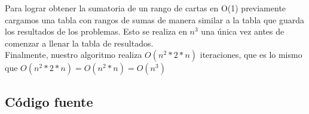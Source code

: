 Para lograr obtener la sumatoria de un rango de cartas en O(1) previamente cargamos una tabla con rangos de sumas de manera similar a la tabla que guarda los resultados de los problemas. Esto se realiza en $n^3$ una \'unica vez antes de comenzar a llenar la tabla de resultados. \\

Finalmente, nuestro algoritmo realiza $O(n^2 * 2*n)$ iteraciones, que es lo mismo que $O(n^2 * 2*n) = O(n^2*n) = O(n^3)$

\newpage

\subsection{C\'odigo fuente}


